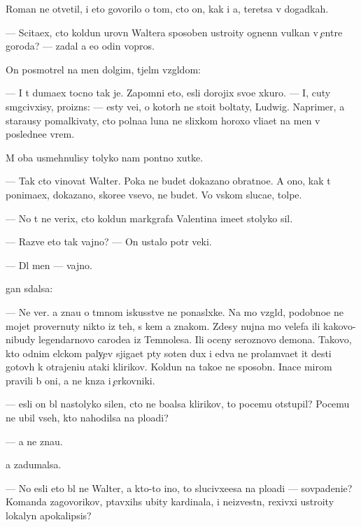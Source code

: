 \documentclass[10pt]{book}
\begin{document}
Roman ne otvetil, i eto govorilo o tom, cto on, kak i {\y}a, ter{\ia}{\y}etsa v dogadkah.

— Scita{\y}ex, cto koldun urovn{\ia} Waltera sposoben ustro{\y}ity ognenn{\yi}{\y} vulkan v {\c}entre goroda? — zadal {\y}a {\y}e{\x}o odin vopros.

On posmotrel na men{\ia} dolgim, t{\ia}jel{\yi}m vzgl{\ia}dom:

— I t{\yi} duma{\y}ex tocno tak je. Zapomni eto, {\y}esli dorojix svo{\y}e{\y} xkuro{\y}. — I, cuty sm{\ia}gcivxisy, proizn{\e}s: — {\Y}esty ve{\x}i, o kotor{\yi}h ne sto{\y}it boltaty, Ludwig. Naprimer, {\y}a stara{\y}usy pomalkivaty, cto polna{\y}a luna ne slixkom horoxo vli{\y}a{\y}et na men{\ia} v posledne{\y}e vrem{\ia}.

M{\yi} oba usmehnulisy tolyko nam pon{\ia}tno{\y} xutke.

— Tak cto vinovat Walter. Poka ne budet dokazano obratno{\y}e. A ono, kak t{\yi} ponima{\y}ex, dokazano, skore{\y}e vsevo, ne budet. Vo vs{\ia}kom sluca{\y}e, tolpe.

— No t{\yi} ne verix, cto koldun markgrafa Valentina ime{\y}et stolyko sil.

— Razve eto tak vajno? — On ustalo pot{\e}r veki.

— Dl{\ia} men{\ia} — vajno.

{\C}{\yi}gan sdalsa:

— Ne ver{\iu}. {\Y}a zna{\y}u o t{\e}mnom iskusstve ne ponasl{\yi}xke. Na mo{\y} vzgl{\ia}d, podobno{\y}e ne mojet provernuty nikto iz teh, s kem {\y}a znakom. Zdesy nujna mo{\x} velefa ili kakovo-nibudy legendarnovo carode{\y}a iz Temnoles{\y}a. Ili oceny ser{\y}oznovo demona. Takovo, kto odnim {\x}elckom paly{\c}ev sjiga{\y}et p{\ia}ty soten dux i {\y}edva ne prolam{\yi}va{\y}et {\x}it des{\ia}ti gotov{\yi}h k otrajeni{\y}u ataki klirikov. Koldun{\yi} na tako{\y}e ne sposobn{\yi}. Inace mirom pravili b{\yi} oni, a ne kn{\ia}z{\y}a i {\c}erkovniki.

— {\Y}esli on b{\yi}l nastolyko silen, cto ne bo{\y}alsa klirikov, to pocemu otstupil? Pocemu ne ubil vseh, kto nahodilsa na plo{\x}adi?

— {\Y}a ne zna{\y}u.

{\Y}a zadumalsa.

— No {\y}esli eto b{\yi}l ne Walter, a kto-to ino{\y}, to slucivxe{\y}esa na plo{\x}adi — sovpadeni{\y}e? Komanda zagovor{\x}ikov, p{\yi}tavxihs{\ia} ubity kardinala, i ne{\y}izvestn{\yi}{\y}, rexivxi{\y} ustro{\y}ity lokalyn{\yi}{\y} apokalipsis?
\end{document}

